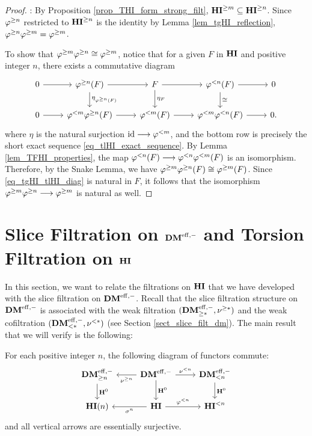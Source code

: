\begin{proof}
 : By Proposition \ref{prop_THI_form_strong_filt},
$\THI{m} \subseteq \THI{n}$. Since $\tgHI{n}$ restricted to
$\THI{n}$ is the identity by Lemma \ref{lem_tgHI_reflection}, 
$\tgHI{n} \tgHI{m} = \tgHI{m}$. 

To show that $\tgHI{m} \tgHI{n} \cong \tgHI{m}$, notice that
for a given $F$ in $\HI$ and positive integer $n$, there exists a 
commutative diagram
\begin{equation}\label{eq_tgHI_tlHI_diag}
\begin{tikzcd}
0 \arrow{r} &
\tgHI{n}(F) \arrow{r} \arrow{d}{\eta_{\tgHI{n}(F)}} &
F \arrow{r} \arrow{d}{\eta_F} &
\tlHI{n}(F) \arrow{r} \arrow{d}{\cong} &
0 \\
0 \arrow{r} &
\tlHI{m} \tgHI{n}(F) \arrow{r} &
\tlHI{m}(F) \arrow{r} &
\tlHI{m}\tlHI{n}(F) \arrow{r} &
0.
\end{tikzcd}
\end{equation}
where $\eta$ is the natural surjection $\id \to \tlHI{m}$, and
the bottom row is precisely the short exact sequence 
\eqref{eq_tlHI_exact_sequence}. By Lemma 
\ref{lem_TFHI_properties}, the map $\tlHI{n}(F) \to \tlHI{n} 
\tlHI{m}(F)$ is an isomorphism. Therefore, by the Snake Lemma, we 
have $\tgHI{m} \tgHI{n}(F) \cong \tgHI{m}(F)$. Since 
\eqref{eq_tgHI_tlHI_diag} is natural in $F$, it follows that the 
isomorphism $\tgHI{m}\tgHI{n} \to \tgHI{m}$ is natural as well.
\end{proof}

\section{Slice Filtration on $\DMeff$ and Torsion Filtration on $\HI$}

In this section, we want to relate the filtrations on $\HI$
that we have developed with the slice filtration on $\DMeff$. 
Recall that the slice filtration structure on $\DMeff$ is 
associated with the weak filtration $(\GFiltDM[*]{\DMeff}, 
\sgDM{*})$ and the weak cofiltration $(\LFiltDM[*]{\DMeff}, 
\slDM{*})$ (see Section \ref{sect_slice_filt_dm}). The main result 
that we will verify is the following:

\begin{prop}\label{prop_H_commute_with_filt}
For each positive integer $n$, the following diagram of functors 
commute:
\[
\begin{tikzcd}
\GFiltDM[n]{\DMeff} \arrow{d}{\HH^0} &
\DMeff \arrow{l}{\sgDM{n}} \arrow{r}{\slDM{n}} \arrow{d}{\HH^0} &
\LFiltDM[n]{\DMeff} \arrow{d}{\HH^0} \\
\HI(n) &
\HI \arrow{l}{\sgHI{n}} \arrow{r}{\tlHI{n}} &
\TFHI{n}
\end{tikzcd}
\]
and all vertical arrows are essentially surjective.
\end{prop}

